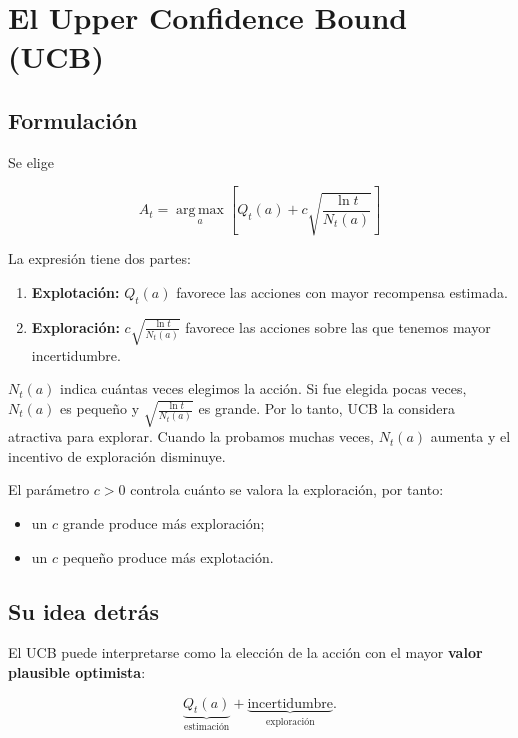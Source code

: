 \documentclass[11pt,a4paper]{article}
\newcommand{\argmax}{\operatorname*{arg\,max}}
\begin{document}
\section{El Upper Confidence Bound (UCB)}

\subsection{Formulación}

Se elige

\begin{equation}
      \boxed{
  A_t=\argmax_a\left[
  Q_t(a)+c\sqrt{\frac{\ln t}{N_t(a)}}
  \right]
  }

\end{equation}

La expresión tiene dos partes:

\begin{enumerate}
  \item \textbf{Explotación:} $Q_t(a)$ favorece las acciones con mayor recompensa
        estimada.
  \item \textbf{Exploración:} $c\sqrt{\frac{\ln t}{N_t(a)}}$ favorece las
        acciones sobre las que tenemos mayor incertidumbre.
\end{enumerate}

$N_t(a)$ indica cuántas veces elegimos la acción. Si fue elegida pocas veces, $N_t(a)$ es pequeño y $\sqrt{\frac{\ln t}{N_t(a)}}$ es grande. Por lo tanto, UCB la considera atractiva para explorar. Cuando la
probamos muchas veces, $N_t(a)$ aumenta y el incentivo de exploración disminuye.

El parámetro $c>0$ controla cuánto se valora la exploración, por tanto:

\begin{itemize}
  \item un $c$ grande produce más exploración;
  \item un $c$ pequeño produce más explotación.
\end{itemize}

\subsection{Su idea detrás}

El UCB puede interpretarse como la elección de la acción con el mayor
\textbf{valor plausible optimista}:

\[
  \underbrace{Q_t(a)}_{\text{estimación}}
  +
  \underbrace{\text{incertidumbre}}_{\text{exploración}}.
\]
\end{document}
